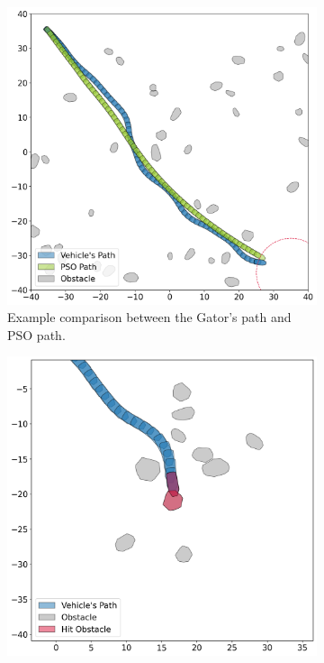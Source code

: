 \begin{figure}[h]
    \captionsetup{justification=centering}
    \centering
    \begin{subfigure}{0.329\textwidth}
        \centering
        \includegraphics[height=.155\paperheight]{images/demonstration/rigid_flat_pso_example3.png}
        \caption{Example comparison between the Gator's path and PSO path.}
        \label{fig:rigid_flat_pso_example3}
    \end{subfigure}
    \hfill
    \begin{subfigure}{0.329\textwidth}
        \centering
        \includegraphics[height=.155\paperheight]{images/demonstration/rigid_40_failure_100.png}

\end{subfigure}
\end{figure}
